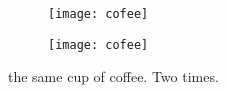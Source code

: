 \documentclass{article}
\begin{document}
	\begin{figure}[h!]
		\centering
		\begin{subfigure}[b]{0.4\linewidth}
			
			\texttt{[image: cofee]}
		\end{subfigure}
	\begin{subfigure}[b]{0.4\linewidth}
		
		\texttt{[image: cofee]}
	\end{subfigure}
\caption{the same cup of coffee. Two times.}
\label{fig:coffee}
\end{figure}
\end{document}
